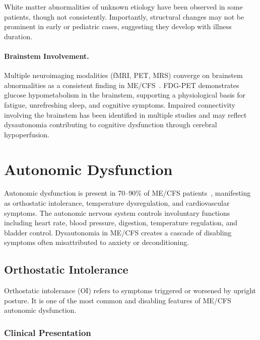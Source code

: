 White matter abnormalities of unknown etiology have been observed in some patients, though not consistently. Importantly, structural changes may not be prominent in early or pediatric cases, suggesting they develop with illness duration.

\paragraph{Brainstem Involvement.}
Multiple neuroimaging modalities (fMRI, PET, MRS) converge on brainstem abnormalities as a consistent finding in ME/CFS~\cite{Shan2020neuroimaging}. FDG-PET demonstrates glucose hypometabolism in the brainstem, supporting a physiological basis for fatigue, unrefreshing sleep, and cognitive symptoms. Impaired connectivity involving the brainstem has been identified in multiple studies and may reflect dysautonomia contributing to cognitive dysfunction through cerebral hypoperfusion.

\section{Autonomic Dysfunction}
\label{sec:autonomic}

Autonomic dysfunction is present in 70--90\% of ME/CFS patients~\cite{Newton2007autonomicDysfunction}, manifesting as ortho\-static in\-tolerance, temperature dys\-regulation, and cardio\-vascular symptoms. The autonomic nervous system controls in\-voluntary functions including heart rate, blood pressure, digestion, temperature regulation, and bladder control. Dys\-autono\-mia in ME/CFS creates a cascade of disabling symptoms often mis\-attributed to anxiety or de\-conditioning.

\subsection{Orthostatic Intolerance}

Orthostatic intolerance (OI) refers to symptoms triggered or worsened by upright posture. It is one of the most common and disabling features of ME/CFS autonomic dysfunction.

\subsubsection{Clinical Presentation}

